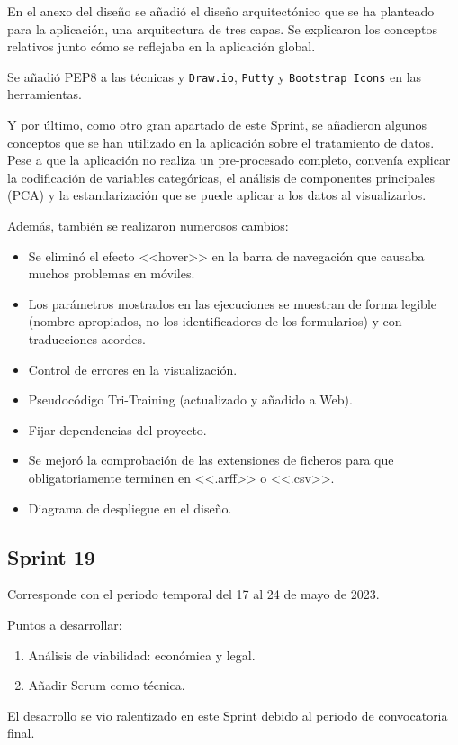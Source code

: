 En el anexo del diseño se añadió el diseño arquitectónico que se ha planteado
para la aplicación, una arquitectura de tres capas. Se explicaron los conceptos
relativos junto cómo se reflejaba en la aplicación global.

Se añadió PEP8 a las técnicas y \texttt{Draw.io}, \texttt{Putty} y
\texttt{Bootstrap Icons} en las herramientas.

Y por último, como otro gran apartado de este Sprint, se añadieron algunos
conceptos que se han utilizado en la aplicación sobre el tratamiento de datos.
Pese a que la aplicación no realiza un pre-procesado completo, convenía explicar
la codificación de variables categóricas, el análisis de componentes principales
(PCA) y la estandarización que se puede aplicar a los datos al visualizarlos.

Además, también se realizaron numerosos cambios:
\begin{itemize}
    \item Se eliminó el efecto <<hover>> en la barra de navegación que causaba
    muchos problemas en móviles.
    \item Los parámetros mostrados en las ejecuciones se muestran de forma
    legible (nombre apropiados, no los identificadores de los formularios) y con
    traducciones acordes.
    \item Control de errores en la visualización.
    \item Pseudocódigo Tri-Training (actualizado y añadido a Web).
    \item Fijar dependencias del proyecto.
    \item Se mejoró la comprobación de las extensiones de ficheros para que
    obligatoriamente terminen en <<.arff>> o <<.csv>>.
    \item Diagrama de despliegue en el diseño.
\end{itemize}

\subsection{Sprint 19}
Corresponde con el periodo temporal del 17 al 24 de mayo de 2023.

Puntos a desarrollar:
\begin{enumerate}
    \item Análisis de viabilidad: económica y legal.
    \item Añadir Scrum como técnica.
\end{enumerate}

El desarrollo se vio ralentizado en este Sprint debido al periodo de
convocatoria final.

